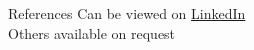 \begin{rubric}{References}
Can be viewed on \href{https://www.linkedin.com/in/nikhilkapila/details/recommendations/?detailScreenTabIndex=0}{LinkedIn}\\
Others available on request
\end{rubric}